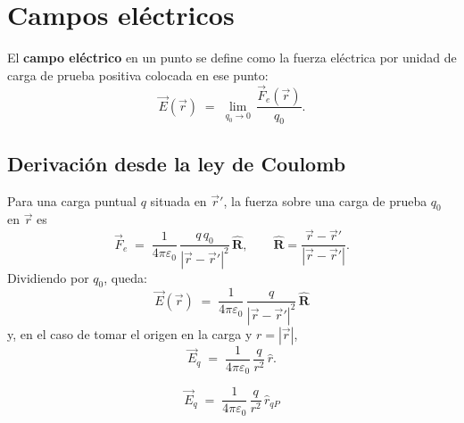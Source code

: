 \documentclass[a4paper,12pt]{article}
\begin{document}
\newpage

\section{Campos eléctricos}
\noindent
El \textbf{campo eléctrico} en un punto se define como la fuerza eléctrica por unidad de carga de prueba positiva colocada en ese punto:
\[
\vec E(\vec r) \;=\; \lim_{q_0 \to 0}\,\frac{\vec F_e(\vec r)}{q_0}.
\]

\subsection*{Derivación desde la ley de Coulomb}
\noindent
Para una carga puntual $q$ situada en $\vec r'$, la fuerza sobre una carga de prueba $q_0$ en $\vec r$ es
\[
\vec F_e \;=\; \frac{1}{4\pi\varepsilon_0}\,\frac{q\,q_0}{|\vec r-\vec r'|^2}\,\hat{\mathbf R},
\qquad \hat{\mathbf R}=\frac{\vec r-\vec r'}{|\vec r-\vec r'|}.
\]
Dividiendo por $q_0$, queda:
\[
\boxed{\;\vec E(\vec r)\;=\;\frac{1}{4\pi\varepsilon_0}\,\frac{q}{|\vec r-\vec r'|^2}\,\hat{\mathbf R}\;}
\]
y, en el caso de tomar el origen en la carga y $r=|\vec r|$,
\[
\vec E_q \;=\; \frac{1}{4\pi\varepsilon_0}\,\frac{q}{r^2}\,\hat r .
\]
\begin{center}
\end{center}

\[
\vec E_q \;=\; \frac{1}{4\pi\varepsilon_0}\,\frac{q}{r^2}\,\hat r_{qP}
\]

\newpage
\end{document}
